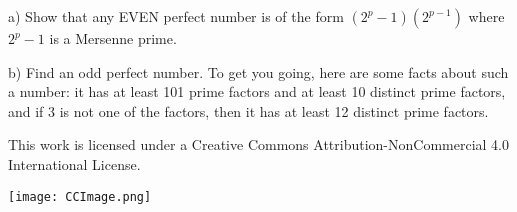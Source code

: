 \documentclass[12pt]{article}
\begin{document}
\bigskip

a) Show that any EVEN perfect number is of the form $(2^p-1)(2^{p-1})$ where $2^p-1$ is a Mersenne prime.

\bigskip

b) Find an odd perfect number. To get you going, here are some facts about such a number: it has at least 101 prime factors and at least 10 distinct prime factors, and if 3 is not one of the factors, then it has at least 12 distinct prime factors. 





\newpage

\begin{mdframed}[outerlinecolor=black,outerlinewidth=2pt,linecolor=cccolor,middlelinewidth=3pt,roundcorner=10pt]
  This work is licensed under a Creative Commons Attribution-NonCommercial 4.0 International License.
  \begin{center}
    \texttt{[image: CCImage.png]}
  \end{center}
\end{mdframed}



\bigskip
\end{document}
